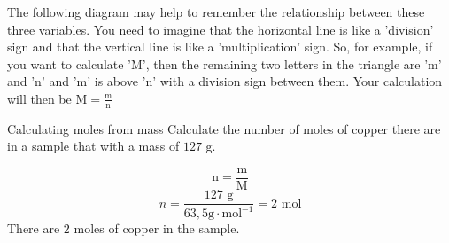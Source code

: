       \label{m38717*id277605}The following diagram may help to remember the relationship between these three variables. You need to imagine that the horizontal line is like a 'division' sign and that the vertical line is like a 'multiplication' sign. So, for example, if you want to calculate 'M', then the remaining two letters in the triangle are 'm' and 'n' and 'm' is above 'n' with a division sign between them. Your calculation will then be $\text{M}=\frac{\text{m}}{\text{n}}$
      \label{m38717*id277613}
    \setcounter{subfigure}{0}
	\begin{figure}[H] %
\begin{center}
\end{center}
 \end{figure}       
      \par 
\label{m38717*secfhsst!!!underscore!!!id409}
      \noindent
      \begin{wex}{Calculating moles from mass }{
\label{m38717*probfhsst!!!underscore!!!id410}
      \label{m38717*id277635}Calculate the number of moles of copper there are in a sample that with a mass of $127 \text{ g}$. 
      }
{
      \label{m38717*id277680}\nopagebreak\noindent{}
        
    \begin{equation*}
    \text{n}=\frac{\text{m}}{\text{M}}
      \end{equation*}
      \label{m38717*id277705}\nopagebreak\noindent{}
    \begin{equation*}
    n=\frac{127 \text{ g}}{63,5 \text{g} \cdot \text{mol}^{-1}}=2 \text{ mol}
      \end{equation*}
      \label{m38717*id277735}There are $2$ moles of copper in the sample.
}
    \end{wex}
    
